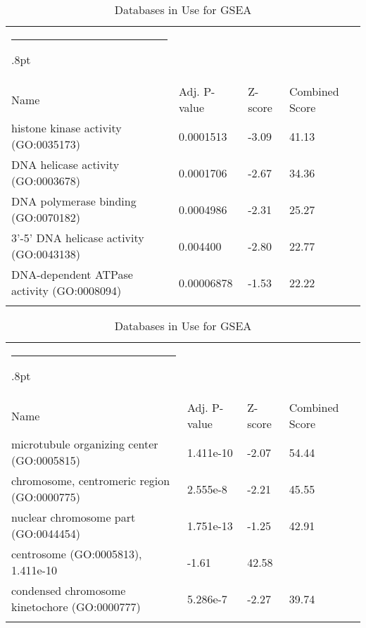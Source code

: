 \documentclass[3p,authoryear,preprint,12pt]{elsarticle}
\makeatletter
\def\hlinewd#1{%
  \noalign{\ifnum0=`}\fi\hrule \@height #1%
  \futurelet\reserved@a\@xhline}
\def\tbltoprule{\hlinewd{.8pt}\\[-12pt]}
\def\tblbottomrule{\noalign{\vspace*{6pt}}\hline\noalign{\vspace*{2pt}}}
\def\tblmidrule{\noalign{\vspace*{6pt}}\hline\noalign{\vspace*{2pt}}}
\makeatother
\begin{document}
\begin{table*}[!htbp]
	\caption{{Databases in Use for GSEA} }
	\label{tw-de478ae31cc6}
	\def\arraystretch{1}
	\ignorespaces 
	\centering 
	\begin{tabulary}{\linewidth}{p{\dimexpr.65\tabcolsep}p{\dimexpr.15\tabcolsep}p{\dimexpr.1\tabcolsep}p{\dimexpr.1\tabcolsep}}
		\tbltoprule Name & Adj. P-value & Z-score & Combined Score\\
		\tblmidrule
histone kinase activity (GO:0035173) & 0.0001513 & -3.09 & 41.13 \\
DNA helicase activity (GO:0003678) & 0.0001706 & -2.67 & 34.36 \\
DNA polymerase binding (GO:0070182) & 0.0004986 & -2.31 & 25.27 \\
3'-5' DNA helicase activity (GO:0043138) & 0.004400 & -2.80 & 22.77 \\
DNA-dependent ATPase activity (GO:0008094) & 0.00006878 & -1.53 & 22.22 \\
		\tblbottomrule
	\end{tabulary}\par 
\end{table*}
\begin{table*}[!htbp]
	\caption{{Databases in Use for GSEA} }
	\label{tw-de478ae31cc6}
	\def\arraystretch{1}
	\ignorespaces 
	\centering 
	\begin{tabulary}{\linewidth}{p{\dimexpr.65\tabcolsep}p{\dimexpr.15\tabcolsep}p{\dimexpr.1\tabcolsep}p{\dimexpr.1\tabcolsep}}
		\tbltoprule Name & Adj. P-value & Z-score & Combined Score\\
		\tblmidrule
microtubule organizing center (GO:0005815) & 1.411e-10 & -2.07 & 54.44 \\
chromosome, centromeric region (GO:0000775) & 2.555e-8 & -2.21 & 45.55 \\
nuclear chromosome part (GO:0044454) & 1.751e-13 & -1.25 & 42.91 \\
centrosome (GO:0005813), 1.411e-10 & -1.61 & 42.58 \\
condensed chromosome kinetochore (GO:0000777) & 5.286e-7 & -2.27 & 39.74 \\
		\tblbottomrule
	\end{tabulary}\par 
\end{table*}
\end{document}
